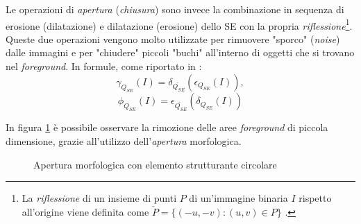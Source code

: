 Le operazioni di \textit{apertura} (\textit{chiusura}) sono invece la combinazione in sequenza di erosione (dilatazione) e dilatazione (erosione) dello SE con la propria \textit{riflessione}\footnote{La \textit{riflessione} di un insieme di punti $P$ di un'immagine binaria $I$ rispetto all'origine viene definita come $\check{P}=\{(-u,-v) \colon (u,v)\in P\}$ \cite{bib:digital-image-processing}.}. Queste due operazioni vengono molto utilizzate per rimuovere "sporco" (\textit{noise}) dalle immagini e per "chiudere" piccoli "buchi" all'interno di oggetti che si trovano nel \textit{foreground}. In formule, come riportato in \cite{bib:top-hat-paper}:
\begin{equation}
	\label{eq:opening}
	\gamma_{Q_{SE}}(I) = \delta_{\check{Q_{SE}}}(\epsilon_{Q_{SE}}(I)),
\end{equation}
\begin{equation}
	\label{eq:closing}
	\phi_{Q_{SE}}(I) = \epsilon_{\check{Q_{SE}}}(\delta_{Q_{SE}}(I))
\end{equation}\par
In figura \ref{fig:opening} \`e possibile osservare la rimozione delle aree \textit{foreground} di piccola dimensione, grazie all'utilizzo dell'\textit{apertura} morfologica.
\begin{figure}[h]
	\centering
	\caption{Apertura morfologica con elemento strutturante circolare} \label{fig:opening}
\end{figure}

